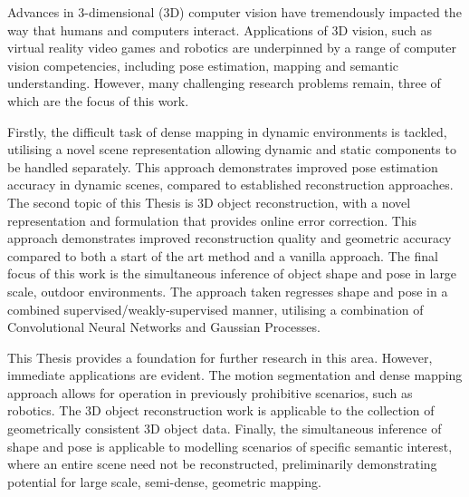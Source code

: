 Advances in 3-dimensional (3D) computer vision have tremendously impacted the way that humans and computers interact. 
Applications of 3D vision, such as virtual reality video games and robotics are underpinned by a range of 
computer vision competencies, including pose estimation, mapping and semantic understanding. However, 
many challenging research problems remain, three of which are the focus of this work.

Firstly, the difficult task of dense mapping in dynamic environments is tackled, utilising a 
novel scene representation allowing dynamic and static components to be handled separately. This approach demonstrates improved 
pose estimation accuracy in dynamic scenes, compared to established reconstruction approaches. The second topic of this Thesis is 
3D object reconstruction, with a novel representation and formulation that provides online error correction. This approach demonstrates 
improved reconstruction quality and geometric accuracy compared to both a start of the art method and a vanilla approach. The final focus 
of this work is the simultaneous inference of object shape and pose in large scale, outdoor environments. 
The approach taken regresses shape and pose in a combined supervised/weakly-supervised manner, utilising a combination of Convolutional 
Neural Networks and Gaussian Processes.

This Thesis provides a foundation for further research in this area. However, immediate applications are evident. The motion 
segmentation and dense mapping approach allows for operation in previously prohibitive scenarios, such as robotics. The 3D object 
reconstruction work is applicable to the collection of geometrically consistent 3D object data. Finally, the simultaneous inference of 
shape and pose is applicable to modelling scenarios of specific semantic interest, where an entire scene need not be reconstructed, 
preliminarily demonstrating potential for large scale, semi-dense, geometric mapping.
